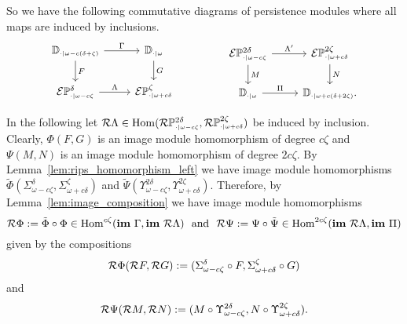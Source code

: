 So we have the following commutative diagrams of persistence modules where all maps are induced by inclusions.
\[\begin{tikzcd}
    \DD{\omega-c(\delta+\zeta)} \arrow{r}{\Gamma}\arrow{d}{F} &
    \DD{\omega} \arrow{d}{G}\\
    \E\PP{\omega-c\zeta}{\delta}\arrow{r}{\Lambda} &
    \E\PP{\omega+c\delta}{\zeta}
  \end{tikzcd}\hspace{10ex}
  \begin{tikzcd}
    \E\PP{\omega-c\zeta}{2\delta} \arrow{r}{\Lambda'}\arrow{d}{M} &
    \E\PP{\omega+c\delta}{2\zeta}\arrow{d}{N}\\
    \DD{\omega} \arrow{r}{\Pi} &
    \DD{\omega+c(\delta+2\zeta)}.
  \end{tikzcd}\]

In the following let $\mathcal{R}\Lambda\in\mathrm{Hom}(\mathcal{R}\mathbb{P}_{\scriptscriptstyle \cdot\mid \omega-c\zeta}^{2\delta},\mathcal{R}\mathbb{P}_{\scriptscriptstyle \cdot\mid \omega+c\delta}^{2\zeta})$ be induced by inclusion.
Clearly, $\Phi(F, G)$ is an image module homomorphism of degree $c\zeta$ and $\Psi(M, N)$ is an image module homomorphism of degree $2c\zeta$.
By Lemma~\ref{lem:rips_homomorphism_left} we have image module homomorphisms $\tilde{\Phi}(\Sigma_{\omega-c\zeta}^\delta, \Sigma_{\omega+c\delta}^\zeta)$ and $\tilde{\Psi}(\Upsilon_{\omega-c\zeta}^{2\delta}, \Upsilon_{\omega+c\delta}^{2\zeta})$.
Therefore, by Lemma~\ref{lem:image_composition} we have image module homomorphisms
\[ \mathcal{R}\Phi := \tilde{\Phi}\circ\Phi\in\mathrm{Hom}^{c\zeta}(\mathbf{im}~\Gamma,\mathbf{im}~\mathcal{R}\Lambda)\ \text{ and }\ \mathcal{R}\Psi :=\Psi\circ\tilde{\Psi}\in\mathrm{Hom}^{2c\zeta}(\mathbf{im}~\mathcal{R}\Lambda, \mathbf{im}~\Pi)\] given by the compositions
\[ \mathcal{R}\Phi(\mathcal{R} F, \mathcal{R} G) := (\Sigma_{\omega-c\zeta}^\delta\circ F, \Sigma_{\omega+c\delta}^\zeta\circ G)\]
and
\[ \mathcal{R}\Psi(\mathcal{R} M, \mathcal{R} N) := (M\circ \Upsilon_{\omega-c\zeta}^{2\delta}, N\circ\Upsilon_{\omega+c\delta}^{2\zeta}).\]

